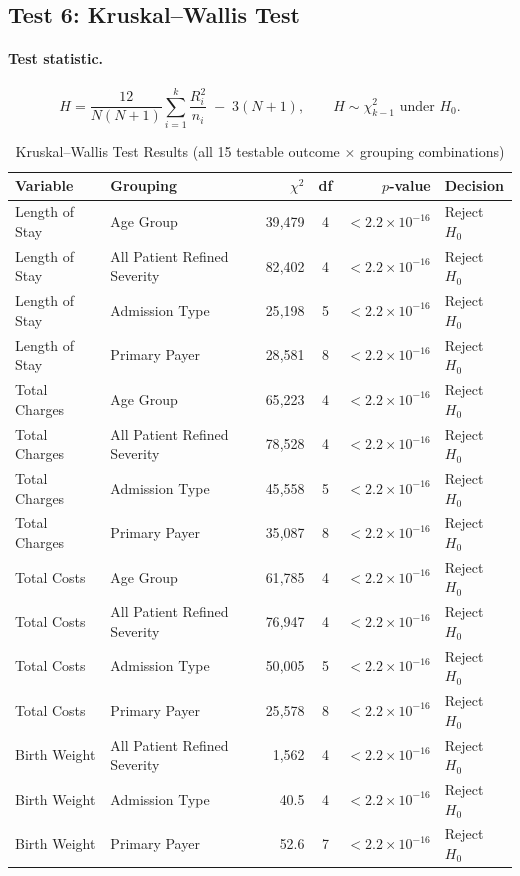 \documentclass[12pt]{article}
\begin{document}
\subsection{Test 6: Kruskal--Wallis Test}

\paragraph{Test statistic.}
\[
  H = \frac{12}{N(N+1)} \sum_{i=1}^{k} \frac{R_i^2}{n_i}
      \;-\; 3(N+1),
  \qquad H \sim \chi^2_{k-1} \text{ under } H_0.
\]

\begin{table}[H]
\centering
\caption{Kruskal--Wallis Test Results (all 15 testable outcome $\times$ grouping combinations)}
\label{tab:kw}
\begin{tabular}{l l r c r l}
\toprule
\textbf{Variable} & \textbf{Grouping} & \textbf{$\chi^2$} & \textbf{df} & \textbf{$p$-value} & \textbf{Decision} \\
\midrule
Length of Stay & Age Group        & 39{,}479 & 4 & $< 2.2\times 10^{-16}$ & Reject $H_0$ \\
Length of Stay & All Patient Refined Severity     & 82{,}402 & 4 & $< 2.2\times 10^{-16}$ & Reject $H_0$ \\
Length of Stay & Admission Type   & 25{,}198 & 5 & $< 2.2\times 10^{-16}$ & Reject $H_0$ \\
Length of Stay & Primary Payer    & 28{,}581 & 8 & $< 2.2\times 10^{-16}$ & Reject $H_0$ \\
Total Charges  & Age Group        & 65{,}223 & 4 & $< 2.2\times 10^{-16}$ & Reject $H_0$ \\
Total Charges  & All Patient Refined Severity     & 78{,}528 & 4 & $< 2.2\times 10^{-16}$ & Reject $H_0$ \\
Total Charges  & Admission Type   & 45{,}558 & 5 & $< 2.2\times 10^{-16}$ & Reject $H_0$ \\
Total Charges  & Primary Payer    & 35{,}087 & 8 & $< 2.2\times 10^{-16}$ & Reject $H_0$ \\
Total Costs    & Age Group        & 61{,}785 & 4 & $< 2.2\times 10^{-16}$ & Reject $H_0$ \\
Total Costs    & All Patient Refined Severity     & 76{,}947 & 4 & $< 2.2\times 10^{-16}$ & Reject $H_0$ \\
Total Costs    & Admission Type   & 50{,}005 & 5 & $< 2.2\times 10^{-16}$ & Reject $H_0$ \\
Total Costs    & Primary Payer    & 25{,}578 & 8 & $< 2.2\times 10^{-16}$ & Reject $H_0$ \\
Birth Weight   & All Patient Refined Severity     &  1{,}562 & 4 & $< 2.2\times 10^{-16}$ & Reject $H_0$ \\
Birth Weight   & Admission Type   &     40.5 & 4 & $< 2.2\times 10^{-16}$ & Reject $H_0$ \\
Birth Weight   & Primary Payer    &     52.6 & 7 & $< 2.2\times 10^{-16}$ & Reject $H_0$ \\
\bottomrule
\end{tabular}
\end{table}
\end{document}
